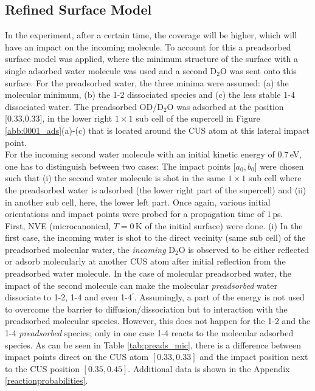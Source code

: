 \documentclass[11pt,DIV=13,BCOR=5mm,a4paper,headinclude]{scrbook}
\begin{document}
\subsection{Refined Surface Model}
In the experiment, after a certain time, the coverage will be higher, which will have an impact on the incoming molecule.
To account for this a preadsorbed surface model was applied, where the minimum structure of the surface with a single adsorbed water molecule was used and a second D$_2$O was sent onto this surface.
For the preadsorbed water, the three minima were assumed: (a) the molecular minimum, (b) the 1-2 dissociated species and (c) the less stable 1-4 dissociated water.
The preadsorbed OD/D$_2$O was adsorbed at the position [0.33,0.33], in the lower right $1\times 1$ sub cell of the supercell in Figure \ref{abb:0001_ads}(a)-(c) that is located around the CUS atom at this lateral impact point.
\\
For the incoming second water molecule with an initial kinetic energy of $0.7\,$eV, one has to distinguish between two cases: The impact points [$a_0,b_0$] were chosen such that (i) the second water molecule is shot in the same $1\times 1$ sub cell where the preadsorbed water is adsorbed (the lower right part of the supercell) and (ii) in another sub cell, here, the lower left part.
Once again, various initial orientations and impact points were probed for a propagation time of $1\,$ps.
\\
First, NVE (microcanonical, $T=0\,$K of the initial surface) were done.
(i) In the first case, the incoming water is shot to the direct vecinity (same sub cell) of the preadsorbed molecular water, the  \textit{incoming} D$_2$O is observed to be either reflected or adsorb molecularly at another CUS atom after initial reflection from the preadsorbed water molecule.
In the case of molecular preadsorbed water, the impact of the second molecule can make the molecular \textit{preadsorbed} water dissociate to 1-2, 1-4 and even 1-4$^\prime$.
Assumingly, a part of the energy is not used to overcome the barrier to diffusion/dissociation but to interaction with the preadsorbed molecular species.
However, this does not happen for the 1-2 and the 1-4 \textit{preadsorbed} species; only in one case 1-4 reacts to the molecular adsorbed species.
As can be seen in Table \ref{tab:preads_mic}, there is a difference between impact points direct on the CUS atom $[0.33,0.33]$ and the impact position next to the CUS position $[0.35,0.45]$.
Additional data is shown in the Appendix \ref{reactionprobabilities}.
\end{document}
